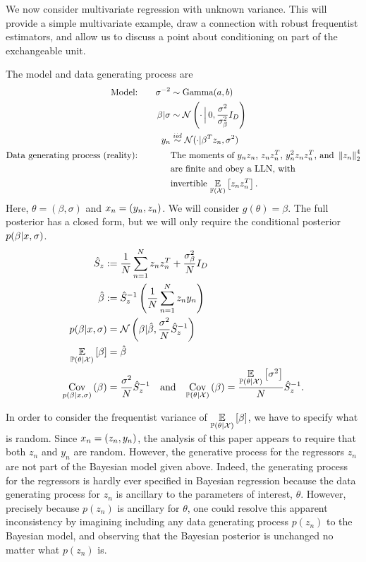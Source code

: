 We now consider multivariate regression with unknown variance.  This will
provide a simple multivariate example, draw a connection with robust frequentist
estimators, and allow us to discuss a point about conditioning on part of
the exchangeable unit.

The model and data generating process are
%
\begin{align*}
%
\textrm{Model:}\quad
&&\sigma^{-2} &\sim \mathrm{Gamma}(a, b)\\
&&\beta \vert \sigma &\sim \normdist\left(\cdot \,\Big|\, 0, \frac{\sigma^2}{\sigma_\beta^2} I_D\right)\\
&&y_n &\iid \normdist(\cdot | \beta^T z_n, \sigma^2)\\
\textrm{Data generating process (reality):}\quad
&&&\textrm{The moments of }
    y_n z_n \textrm{, } z_n z_n^T \textrm{, } y_n^2 z_n z_n^T
    \textrm{, and } \norm{z_n}_2^4\\
&&&\textrm{are finite and obey a LLN, with}\\
&&&\textrm{invertible }\expect{\xfdist}{z_n z_n^T}.
%
\end{align*}
%
Here, $\theta = (\beta, \sigma)$ and $x_n = (y_n, z_n)$.  We will consider
$g(\theta) = \beta$.  The full posterior has a closed form, but we will only
require the conditional posterior $p(\beta \vert x, \sigma)$.
%
\begin{align*}
%
\hat{S}_z :={}& \meann z_n z_n^T + \frac{\sigma_\beta^2}{N} I_D\\
\hat\beta :={}& \hat{S}_z^{-1} \left(\meann z_n y_n\right)\\
p(\beta \vert \x, \sigma) ={}&
    \normdist\left(\beta \vert \hat\beta, \frac{\sigma^2}{N} \hat{S}_z^{-1} \right)\\
\expect{\post}{\beta} ={}& \hat\beta\\
\cov{p(\beta \vert \x, \sigma)}{\beta} ={}& \frac{\sigma^2}{N} \hat{S}_z^{-1}
\quad\textrm{and}\quad
\cov{\post}{\beta} ={} \frac{\expect{\post}{\sigma^2}}{N} \hat{S}_z^{-1}.
%
\end{align*}

In order to consider the frequentist variance of $\underset{\mathbb{P}(\theta | {\mathcal{X}})}{\mathbb{E}}\left[\beta\right]$, we
have to specify what is random.  Since $x_n = (z_n, y_n)$, the analysis of
this paper appears to require that both $z_n$ and $y_n$ are random. However, the
generative process for the regressors $z_n$ are not part of the Bayesian model
given above.  Indeed, the generating process for the regressors is hardly
ever specified in Bayesian regression because the data generating
process for $z_n$ is ancillary to the parameters of interest, $\theta$.
However, precisely because $p(z_n)$ is ancillary for $\theta$, one could resolve
this apparent inconsistency by imagining including any data generating process
$p(z_n)$ to the Bayesian model, and observing that the Bayesian posterior is
unchanged no matter what $p(z_n)$ is.

